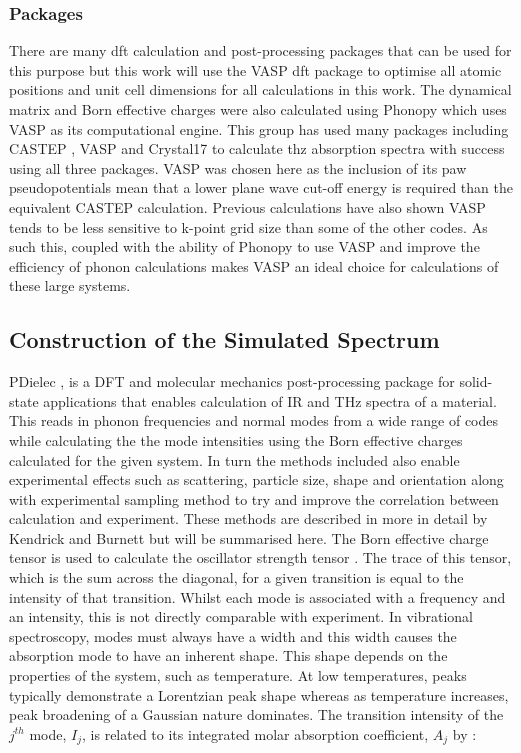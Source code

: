 \subsubsection{Packages}
There are many \acrshort{dft} calculation and post-processing packages that can be used for this purpose \cite{Clark2005, Gale2011, dovesi2020crystal} but this work will use the VASP \cite{Hafner2008} \acrshort{dft} package to optimise all atomic positions and unit cell dimensions for all calculations in this work. The dynamical matrix and Born effective charges were also calculated using Phonopy \cite{Togo2015} which uses VASP as its computational engine. This group has used many packages including CASTEP \cite{Clark2005}, VASP and Crystal17 to calculate \acrshort{thz} absorption spectra with success using all three packages. VASP was chosen here as the inclusion of its \acrshort{paw} pseudopotentials mean that a lower plane wave cut\nobreakdash-off energy is required than the equivalent CASTEP calculation. Previous calculations have also shown VASP tends to be less sensitive to k\nobreakdash-point grid size than some of the other codes. As such this, coupled with the ability of Phonopy to use VASP and improve the efficiency of phonon calculations makes VASP an ideal choice for calculations of these large systems.

\subsection{Construction of the Simulated Spectrum}
\label{subsec:pdielec}
PDielec \cite{Kendrick2016}, is a DFT and molecular mechanics post\nobreakdash-processing package for solid\nobreakdash-state applications that enables calculation of IR and THz spectra of a material. This reads in phonon frequencies and normal modes from a wide range of codes while calculating the the mode intensities using the Born effective charges calculated for the given system. In turn the methods included also enable experimental effects such as scattering, particle size, shape and orientation along with experimental sampling method to try and improve the correlation between calculation and experiment. These methods are described in more in detail by Kendrick and Burnett \cite{Kendrick2016, Kendrick2020, john_kendrick_2022_5888313} but will be summarised here. The Born effective charge tensor is used to calculate the oscillator strength tensor \cite{Gonze1997}. The trace of this tensor, which is the sum across the diagonal, for a given transition is equal to the intensity of that transition.
Whilst each mode is associated with a frequency and an intensity, this is not directly comparable with experiment. In vibrational spectroscopy, modes must always have a width and this width causes the absorption mode to have an inherent shape. This shape depends on the properties of the system, such as temperature. At low temperatures, peaks typically demonstrate a Lorentzian peak shape whereas as temperature increases, peak broadening of a Gaussian nature dominates. The transition intensity of the \(j^{th}\) mode, \(I_j\), is related to its integrated molar absorption coefficient, \(A_j\) by \cite{Wilson1955}:


